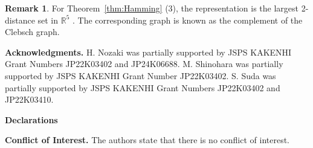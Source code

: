 \documentclass[a4paper, 11pt]{article}
\theoremstyle{definition}
\newtheorem{remark}[theorem]{Remark}
\begin{document}
\begin{remark}
For Theorem~\ref{thm:Hamming} (3), the representation is the largest 2-distance set in $\mathbb{R}^5$ \cite{L97}. 
The corresponding graph is known as the complement of the Clebsch graph. 
\end{remark}

\bigskip

\noindent
\textbf{Acknowledgments.} 
H. Nozaki was partially supported by JSPS KAKENHI Grant Numbers JP22K03402 and JP24K06688. 
M. Shinohara was partially supported by JSPS KAKENHI Grant Number JP22K03402. 
S. Suda was partially supported by JSPS KAKENHI Grant Numbers JP22K03402 and JP22K03410.

\quad 

\noindent
\textbf{Declarations}

\quad 

\noindent 
\textbf{Conflict of Interest.}
The authors state
that there is no conflict of interest. 
\end{document}
